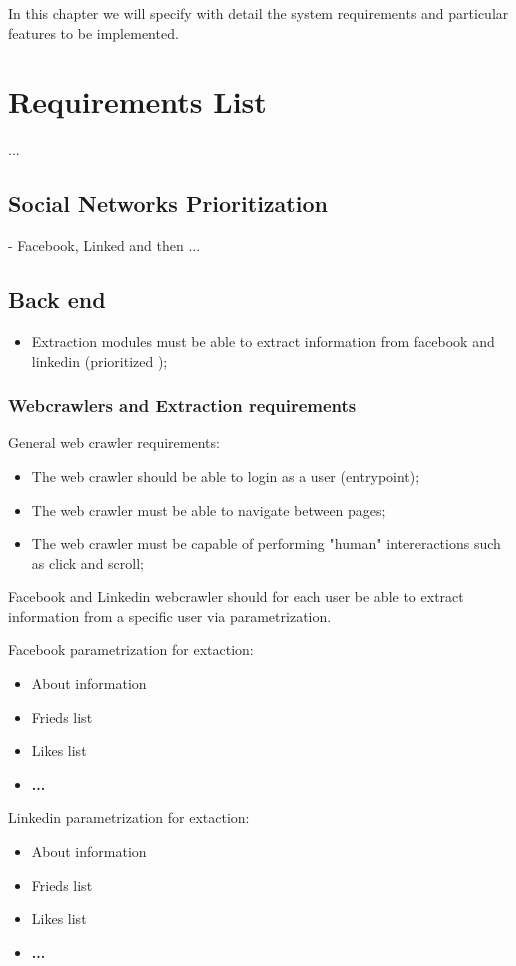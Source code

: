 In this chapter we will specify with detail the system requirements and particular features to be implemented.

\section{Requirements List}

...

\subsection{Social Networks Prioritization}
- Facebook, Linked and then ...


\subsection{Back end}
\begin{itemize}
    \item Extraction modules must be able to extract information from facebook and linkedin (prioritized );
\end{itemize}

\subsubsection{Webcrawlers and Extraction requirements}
\item General web crawler requirements:
\begin{itemize}
    \item The web crawler should be able to login as a user (entrypoint);
    \item The web crawler must be able to navigate between pages;
    \item The web crawler must be capable of performing "human" intereractions such as click and scroll;
\end{itemize}
\item Facebook and Linkedin webcrawler should for each user be able to extract information from a specific user via parametrization.
\item Facebook parametrization for extaction:
\begin{itemize}
    \item About information
    \item Frieds list
    \item Likes list
    \item \textbf{...}
\end{itemize}
\item Linkedin parametrization for extaction:
\begin{itemize}
    \item About information
    \item Frieds list
    \item Likes list
    \item \textbf{...}
\end{itemize}

